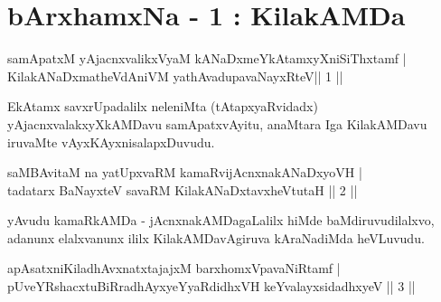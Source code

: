 


\chapter{bArxhamxNa - 1 : KilakAMDa}
\begin{shl}
samApatxM yAjacnxvalikxVyaM kANaDxmeYkAtamxyXniSiThxtamf  | \\
KilakANaDxmatheVdAniVM yathAvadupavaNayxRteV\hfill ||  1 ||  
\end{shl}

\begin{artha}
EkAtamx savxrUpadalilx neleniMta (tAtapxyaRvidadx) yAjacnxvalakxyXkAMDavu samApatxvAyitu, anaMtara Iga KilakAMDavu iruvaMte vAyxKAyxnisalapxDuvudu.
\end{artha}


\begin{shl}
saMBAvitaM na yatUpxvaRM kamaRvijAcnxnakANaDxyoVH |  \\
tadatarx BaNayxteV savaRM KilakANaDxtavxheVtutaH \hfill||  2 ||  
\end{shl}

\begin{artha}
yAvudu kamaRkAMDa - jAcnxnakAMDagaLalilx hiMde baMdiruvudilalxvo, adanunx elalxvanunx ililx KilakAMDavAgiruva kAraNadiMda heVLuvudu.
\end{artha}


\begin{shl}
apAsatxniKiladhAvxnatxtajajxM barxhomxVpavaNiRtamf  | \\
pUveYRshacxtuBiRradhAyxyeYyaRdidhxVH keYvalayxsidadhxyeV \hfill ||  3 ||
\end{shl}

